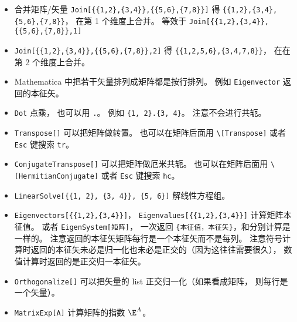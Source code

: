 \begin{itemize}
\item 合并矩阵/矢量 \verb|Join[{{1,2},{3,4}},{{5,6},{7,8}}]| 得 \verb|{{1,2},{3,4},{5,6},{7,8}}|， 在第 1 个维度上合并。 等效于 \verb|Join[{{1,2},{3,4}},{{5,6},{7,8}},1]|
\item \verb|Join[{{1,2},{3,4}},{{5,6},{7,8}},2]| 得 \verb|{{1,2,5,6},{3,4,7,8}}|， 在在第 2 个维度上合并。
\item Mathematica 中把若干矢量排列成矩阵都是按行排列。 例如 \verb|Eigenvector| 返回的本征矢。
\item \verb|Dot| 点乘， 也可以用 \verb|.|。 例如 \verb|{1, 2}.{3, 4}|。 注意不会进行共轭。
\item \verb|Transpose[]| 可以把矩阵做转置。 也可以在矩阵后面用 \verb|\[Transpose]| 或者 \verb|Esc| 键搜索 \verb|tr|。
\item \verb|ConjugateTranspose[]| 可以把矩阵做厄米共轭。 也可以在矩阵后面用 \verb|\[HermitianConjugate]| 或者 \verb|Esc| 键搜索 \verb|hc|。
\item \verb|LinearSolve[{{1, 2}, {3, 4}}, {5, 6}]| 解线性方程组。
\item \verb|Eigenvectors[{{1,2},{3,4}}]|， \verb|Eigenvalues[{{1,2},{3,4}}]| 计算矩阵本征值。 或者 \verb|EigenSystem[矩阵]|， 一次返回 \verb|{本征值，本征矢}|，和分别计算是一样的。 注意返回的本征矢矩阵每行是一个本征矢而不是每列。 注意符号计算时返回的本征矢未必是归一化也未必是正交的（因为这往往需要很久）， 数值计算时返回的是正交归一本征矢。
\item \verb|Orthogonalize[]| 可以把矢量的 list 正交归一化（如果看成矩阵， 则每行是一个矢量）。
\item \verb|MatrixExp[A]| 计算矩阵的指数 $\E^{A}$。
\end{itemize}


